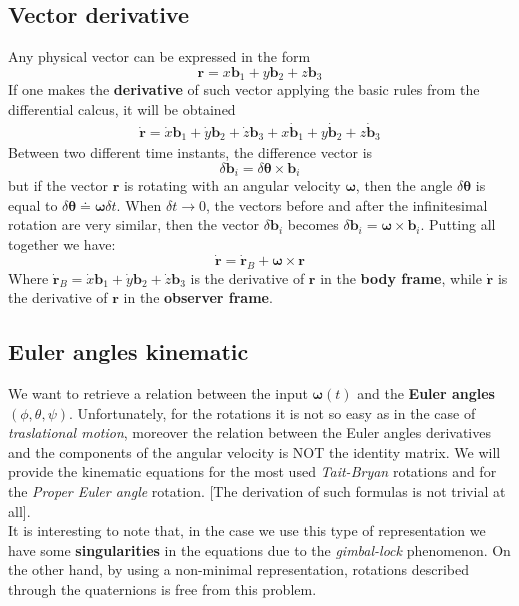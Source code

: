 \subsection{Vector derivative}
Any physical vector can be expressed in the form
{\large{
    \begin{equation}
        \mathbf{r} = x \mathbf{b}_1 +
                     y \mathbf{b}_2 +
                     z \mathbf{b}_3
    \end{equation}
}}
If one makes the \textbf{derivative} of such vector applying the basic rules from the differential calcus, it will be obtained
{\large{
    \begin{align}
        \dot{\mathbf{r}} = \dot{x} \mathbf{b}_1 +
                           \dot{y} \mathbf{b}_2 +
                           \dot{z} \mathbf{b}_3 +
                           x \dot{\mathbf{b}}_1 +
                           y \dot{\mathbf{b}}_2 + 
                           z \dot{\mathbf{b}}_3
    \end{align}
}}
Between two different time instants, the difference vector is
\begin{equation}
    \delta{\mathbf{b}}_i = \delta\boldsymbol{\theta} \times \mathbf{b}_i 
\end{equation}
but if the vector $\mathbf{r}$ is rotating with an angular velocity $\boldsymbol{\omega}$, then the angle $\delta\boldsymbol{\theta}$ is equal to $\delta\mathbf{\theta} \doteq \boldsymbol{\omega}\delta t$. When $\delta t\to 0$, the vectors before and after the infinitesimal rotation are very similar, then the vector $\delta\mathbf{b}_i$ becomes $\delta\mathbf{b}_i=\boldsymbol{\omega}\times \mathbf{b}_i$. Putting all together we have:
{\large{
    \begin{equation}
        \dot{\mathbf{r}} = \dot{\mathbf{r}}_B + \boldsymbol{\omega} \times \mathbf{r}
    \end{equation}
}}
Where $\dot{\mathbf{r}}_B=\dot{x} \mathbf{b}_1 +
\dot{y} \mathbf{b}_2 +
\dot{z} \mathbf{b}_3$ is the derivative of $\mathbf{r}$ in the \textbf{body frame}, while $\dot{\mathbf{r}}$ is the derivative of $\mathbf{r}$ in the \textbf{observer frame}.

\subsection{Euler angles kinematic}
We want to retrieve a relation between the input $\mathbf{\omega}(t)$ and the \textbf{Euler angles} $(\phi, \theta, \psi)$. Unfortunately, for the rotations it is not so easy as in the case of \textit{traslational motion}, moreover the relation between the Euler angles derivatives and the components of the angular velocity is NOT the identity matrix. We will provide the kinematic equations for the most used \textit{Tait-Bryan} rotations and for the \textit{Proper Euler angle} rotation. [The derivation of such formulas is not trivial at all].\\
It is interesting to note that, in the case we use this type of representation we have some \textbf{singularities} in the equations due to the \textit{gimbal-lock} phenomenon. On the other hand, by using a non-minimal representation, rotations described through the quaternions is free from this problem.

